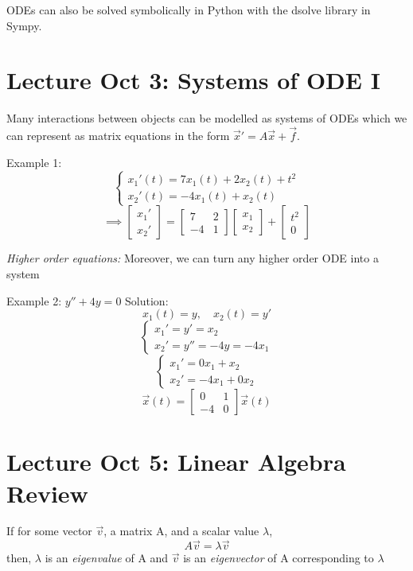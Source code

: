 \documentclass[12pt]{article}
\begin{document}
ODEs can also be solved symbolically in Python with the dsolve library in Sympy.

\section{Lecture Oct 3: Systems of ODE I}
Many interactions between objects can be modelled as systems of ODEs which we can represent as matrix equations in the form $\vec{x}' = A\vec{x} + \vec{f}$.

Example 1: 
\[\begin{cases}
    x_1'(t) = 7x_1(t) + 2x_2(t) + t^2\\
    x_2'(t) = -4x_1(t) + x_2(t)
\end{cases}\]
\[\implies \begin{bmatrix}
    x_1'\\
    x_2'
\end{bmatrix} = \begin{bmatrix}
    7 & 2\\
    -4 & 1
\end{bmatrix} \begin{bmatrix}
    x_1\\
    x_2
\end{bmatrix} + \begin{bmatrix}
    t^2\\
    0
\end{bmatrix}\]

\emph{Higher order equations:} Moreover, we can turn any higher order ODE into a system 

Example 2: $y'' + 4y = 0$
Solution:
\[x_1(t) = y, \quad x_2(t) = y'\]
\[\begin{cases}
    x_1' = y' = x_2\\
    x_2' = y'' = -4y = -4x_1
\end{cases}\]
\[\begin{cases}
    x_1' = 0x_1 + x_2\\
    x_2' = -4x_1 + 0x_2
\end{cases}\]
\[\vec{x}(t) = \begin{bmatrix}
    0 & 1\\
    -4 & 0
\end{bmatrix} \vec{x}(t)\]

\section{Lecture Oct 5: Linear Algebra Review}
If for some vector $\vec{v}$, a matrix A, and a scalar value $\lambda$, 
\[A\vec{v} = \lambda\vec{v}\]
then,
$\lambda$ is an \emph{eigenvalue} of A and $\vec{v}$ is an \emph{eigenvector} of A corresponding to $\lambda$
\end{document}
